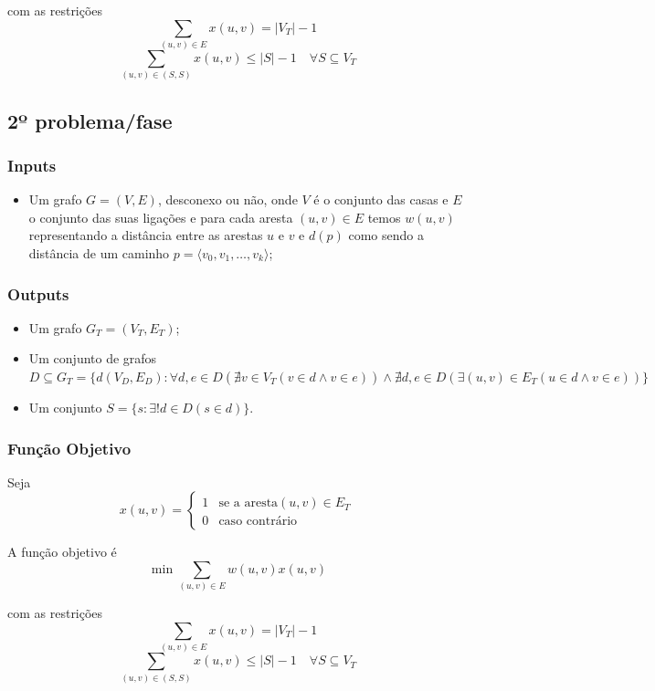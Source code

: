 \documentclass[a4paper,12pt,titlepage]{article}
\begin{document}
com as restrições 
$$\sum_{(u,v)\in E} x(u,v) = |V_T| - 1$$
$$\sum_{(u,v)\in (S,S)} x(u,v) \leq |S| - 1 \quad \forall S \subseteq  V_T$$

\subsection{2º problema/fase}
\subsubsection*{Inputs}
\begin{itemize}
\item Um grafo  $G= ( V, E ) $, desconexo ou não, onde $V$ é o conjunto das casas e $E$ o conjunto das suas ligações e para cada aresta $(u,v)\in E$ temos $w(u,v)$ representando a distância entre as arestas $u$ e $v$ e $d(p)$ como sendo a distância de um caminho $p = \langle v_0,v_1,\ldots , v_k\rangle$\cite[p.~624]{intro_algo};
\end{itemize}

\subsubsection*{Outputs}
\begin{itemize}
\item Um grafo $G_T = ( V_T,E_T )$;
\item Um conjunto de grafos $D \subseteq G_T = \{d(V_D,E_D): \forall d,e \in D(\nexists v \in V_T(v \in d \land v \in e)) \land \nexists d,e\in D(\exists(u,v) \in E_T(u \in d \land v \in e)) \}$
\item Um conjunto $S = \{s : \exists! d \in D(s \in d)\}$.
\end{itemize}

\subsubsection*{Função Objetivo}
Seja $$x(u,v) = \begin{cases}
1 & \text{se a aresta} (u,v) \in E_T\\
0 & \text{caso contrário} 
\end{cases}$$

A função objetivo é\cite{ieor_mst}
$$\min \sum_{(u,v)\in E} w(u,v)x(u,v)$$

com as restrições 
$$\sum_{(u,v)\in E} x(u,v) = |V_T| - 1$$
$$\sum_{(u,v)\in (S,S)} x(u,v) \leq |S| - 1 \quad \forall S \subseteq V_T$$
\linebreak
\linebreak
\linebreak
\linebreak
\end{document}
